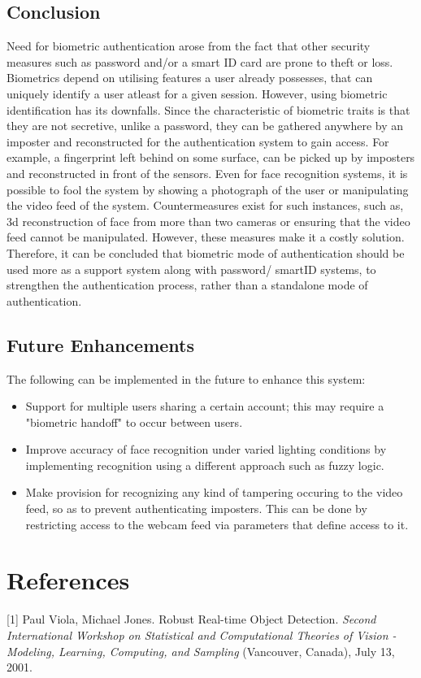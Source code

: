 \documentclass[12pt]{article}			%
\begin{document}
\subsection {Conclusion}
Need for biometric authentication arose from the fact that other security measures such as password and/or a smart ID card are prone to theft or loss. Biometrics depend on utilising features a user already possesses, that can uniquely identify a user atleast for a given session. However, using biometric identification has its downfalls. Since the characteristic of biometric traits is that they are not secretive, unlike a password, they can be gathered anywhere by an imposter and reconstructed for the authentication system to gain access. For example, a fingerprint left behind on some surface, can be picked up by imposters and reconstructed in front of the sensors. Even for face recognition systems, it is possible to fool the system by showing a photograph of the user or manipulating the video feed of the system. Countermeasures exist for such instances, such as, 3d reconstruction of face from more than two cameras or ensuring that the video feed cannot be manipulated. However, these measures make it a costly solution. Therefore, it can be concluded that biometric mode of authentication should be used more as a support system along with password/ smartID systems, to strengthen the authentication process, rather than a standalone mode of authentication.   

\subsection {Future Enhancements}
The following can be implemented in the future to enhance this system:
\begin{itemize}
\item Support for multiple users sharing a certain account; this may require a "biometric handoff" to occur between users.
\item Improve accuracy of face recognition under varied lighting conditions by implementing recognition using a different approach such as fuzzy logic.
\item Make provision for recognizing any kind of tampering occuring to the video feed, so as to prevent authenticating imposters. This can be done by restricting access to the webcam feed via parameters that define access to it.
\end{itemize}


\section{ References }
[1] Paul Viola, Michael Jones. Robust Real-time Object Detection. \textit {Second International Workshop on Statistical and Computational Theories of Vision - Modeling, Learning, Computing, and Sampling} (Vancouver, Canada), July 13, 2001. 
\end{document}
